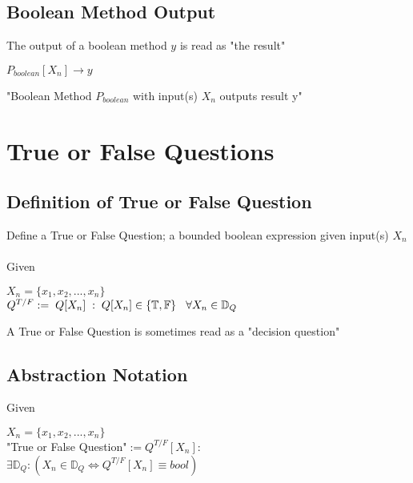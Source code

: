 \documentclass[11pt]{article}
\begin{document}
\subsection{Boolean Method Output}
The output of a boolean method $y$ is read as "the result"
\vspace{1mm}
\begin{center}
$
P_{boolean}[X_n] \rightarrow y
$
\end{center}
\vspace{1mm}
"Boolean Method $P_{boolean}$ with input(s) $X_n$ outputs result y"







\newpage

\section{True or False Questions}

\subsection{Definition of True or False Question}
Define a True or False Question; a bounded boolean expression given input(s) $X_n$\\
\\
Given
\begin{center}
$
X_n = \{x_1,x_2,...,x_n\}
$
\\ \vspace{4mm}
$
Q^{T/F} := \hspace{1mm}Q[X_n]\hspace{1mm}:\hspace{1mm} Q[X_n] \in \{\mathbb{T},\mathbb{F}\} \hspace{3mm} \forall X_n \in \mathbb{D}_Q
$
\vspace{1mm}
\end{center}
A True or False Question is sometimes read as a "decision question"


\subsection{Abstraction Notation}
\vspace{1mm}
Given
\begin{center}
$
X_n = \{x_1,x_2,...,x_n\}
$
\\ \vspace{6mm}
"True or False Question"$ := Q^{T/F}[X_n]:
$
\\ \vspace{4mm}
$
\exists \mathbb{D}_Q : (X_n \in \mathbb{D}_Q \Leftrightarrow Q^{T/F}[X_n] \equiv bool) 
$
\end{center}
\vspace{.1mm}
\end{document}
